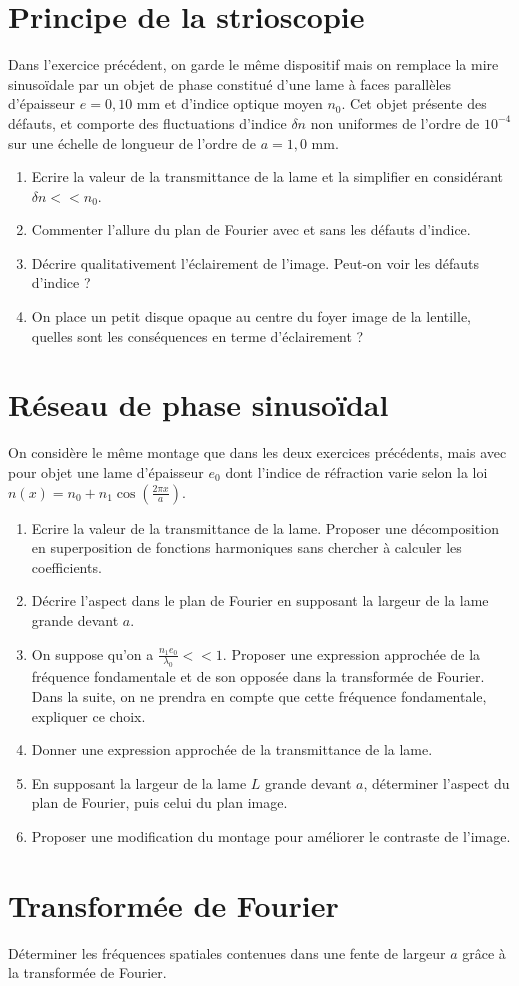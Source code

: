 \documentclass{article}
\begin{document}
\section{Principe de la strioscopie}
Dans l'exercice précédent, on garde le même dispositif mais on remplace la mire sinusoïdale par un objet de phase constitué d'une lame à faces parallèles d'épaisseur $e=0,10$ mm et d'indice optique moyen $n_0$. 
Cet objet présente des défauts, et comporte des fluctuations d'indice $\delta n$ non uniformes de l'ordre de $10^{-4}$ sur une échelle de longueur de l'ordre de $a = 1,0 $ mm. 
\begin{enumerate}
  \item Ecrire la valeur de la transmittance de la lame et la simplifier en considérant $\delta n << n_0$.
  \item Commenter l'allure du plan de Fourier avec et sans les défauts d'indice. 
  \item Décrire qualitativement l'éclairement de l'image. Peut-on voir les défauts d'indice ? 
  \item On place un petit disque opaque au centre du foyer image de la lentille, quelles sont les conséquences en terme d'éclairement ? 
\end{enumerate}


\section{Réseau de phase sinusoïdal}

On considère le même montage que dans les deux exercices précédents, mais avec pour objet une lame d'épaisseur $e_0$ dont l'indice de réfraction varie selon la loi $n(x) = n_0 + n_1 \cos \left( \frac{2\pi x}{a} \right)$.
\begin{enumerate}
  \item Ecrire la valeur de la transmittance de la lame. Proposer une décomposition en superposition de fonctions harmoniques sans chercher à calculer les coefficients. 
  \item Décrire l'aspect dans le plan de Fourier en supposant la largeur de la lame grande devant $a$. 
  \item On suppose qu'on a $\frac{n_1 e_0}{\lambda_0} <<1. $ Proposer une expression approchée de la fréquence fondamentale et de son opposée dans la transformée de Fourier. Dans la suite, on ne prendra en compte que cette fréquence fondamentale, expliquer ce choix. 
  \item Donner une expression approchée de la transmittance de la lame.
  \item En supposant la largeur de la lame $L$ grande devant $a$, déterminer l'aspect du plan de Fourier, puis celui du plan image. 
  \item Proposer une modification du montage pour améliorer le contraste de l'image. 
\end{enumerate} 
\section{Transformée de Fourier}

Déterminer les fréquences spatiales contenues dans une fente de largeur $a$ grâce à la transformée de Fourier. 
\end{document}
